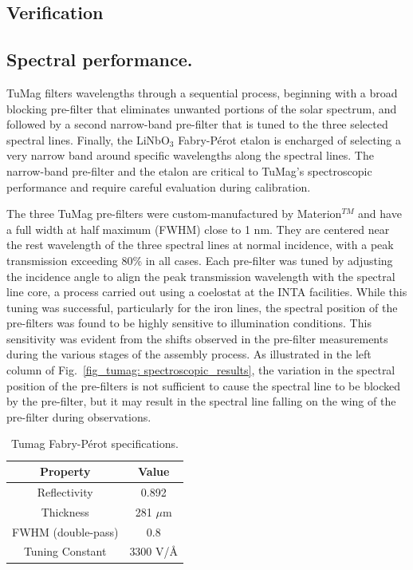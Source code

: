 \subsection{Verification}



\subsection{Spectral performance.}

TuMag filters wavelengths through a sequential process, beginning with a broad blocking pre-filter that eliminates unwanted portions of the solar spectrum, and followed by a second narrow-band pre-filter that is tuned to the three selected spectral lines. Finally, the LiNbO$_3$ Fabry-Pérot etalon is encharged of selecting a very narrow band around specific wavelengths along the spectral lines. The narrow-band pre-filter and the etalon are critical to TuMag's spectroscopic performance and require careful evaluation during calibration.

The three TuMag pre-filters were custom-manufactured by Materion$^{TM}$ and have a full width at half maximum (FWHM) close to 1 nm. They are centered near the rest wavelength of the three spectral lines at normal incidence, with a peak transmission exceeding 80\% in all cases. Each pre-filter was tuned by adjusting the incidence angle to align the peak transmission wavelength with the spectral line core, a process carried out using a coelostat at the INTA facilities. While this tuning was successful, particularly for the iron lines, the spectral position of the pre-filters was found to be highly sensitive to illumination conditions. This sensitivity was evident from the shifts observed in the pre-filter measurements during the various stages of the assembly process. As illustrated in the left column of Fig.~\ref{fig_tumag: spectroscopic_results}, the variation in the spectral position of the pre-filters is not sufficient to cause the spectral line to be blocked by the pre-filter, but it may result in the spectral line falling on the wing of the pre-filter during observations.

\begin{table}
    \centering
   \begin{tabular}{cc}
    \hline
    \hline
    Property & Value \\
    \hline
    Reflectivity & 0.892 \\
    Thickness & 281 $\mu$m\\
    FWHM (double-pass) & 0.8\\
    Tuning Constant & 3300 V/\r{A}\\
    \hline
    \hline
    \end{tabular}
    \caption{Tumag Fabry-Pérot specifications.}
    \label{table: Tumags etalon}
\end{table}

